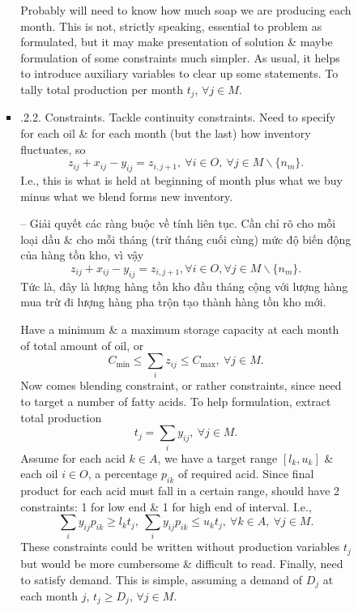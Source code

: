 \documentclass{article}
\begin{document}
\begin{itemize}
\begin{itemize}
\begin{itemize}
\begin{itemize}
                Probably will need to know how much soap we are producing each month. This is not, strictly speaking, essential to problem as formulated, but it may make presentation of solution \& maybe formulation of some constraints much simpler. As usual, it helps to introduce auxiliary variables to clear up some statements. To tally total production per month $t_j$, $\forall j\in M$.
                \item {.2.2. Constraints.} Tackle continuity constraints. Need to specify for each oil \& for each month (but the last) how inventory fluctuates, so
                \begin{equation*}
                    z_{ij} + x_{ij} - y_{ij} = z_{i,j+1},\ \forall i\in O,\ \forall j\in M\backslash\{n_m\}.
                \end{equation*}
                I.e., this is what is held at beginning of month plus what we buy minus what we blend forms new inventory.

                -- Giải quyết các ràng buộc về tính liên tục. Cần chỉ rõ cho mỗi loại dầu \& cho mỗi tháng (trừ tháng cuối cùng) mức độ biến động của hàng tồn kho, vì vậy
                \begin{equation*}
                    z_{ij} + x_{ij} - y_{ij} = z_{i,j+1}, \forall i\in O, \forall j\in M\backslash\{n_m\}.
                \end{equation*}
                Tức là, đây là lượng hàng tồn kho đầu tháng cộng với lượng hàng mua trừ đi lượng hàng pha trộn tạo thành hàng tồn kho mới.

                Have a minimum \& a maximum storage capacity at each month of total amount of oil, or
                \begin{equation*}
                    C_{\min}\le\sum_i z_{ij}\le C_{\max},\ \forall j\in M.
                \end{equation*}
                Now comes blending constraint, or rather constraints, since need to target a number of fatty acids. To help formulation, extract total production
                \begin{equation*}
                    t_j = \sum_i y_{ij},\ \forall j\in M.
                \end{equation*}
                Assume for each acid $k\in A$, we have a target range $[l_k,u_k]$ \& each oil $i\in O$, a percentage $p_{ik}$ of required acid. Since final product for each acid must fall in a certain range, should have 2 constraints: 1 for low end \& 1 for high end of interval. I.e.,
                \begin{equation*}
                    \sum_i y_{ij}p_{ik}\ge l_kt_j,\ \sum_i y_{ij}p_{ik}\le u_kt_j,\ \forall k\in A,\ \forall j\in M.
                \end{equation*}
                These constraints could be written without production variables $t_j$ but would be more cumbersome \& difficult to read. Finally, need to satisfy demand. This is simple, assuming a demand of $D_j$ at each month $j$, $t_j\ge D_j$, $\forall j\in M$.


\end{itemize}
\end{itemize}
\end{itemize}
\end{itemize}
\end{document}
